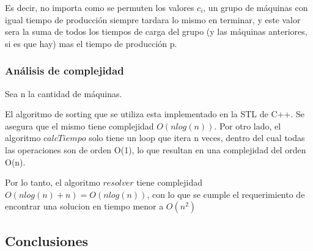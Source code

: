 Es decir, no importa como se permuten los valores $c_i$, un grupo de m\'aquinas con igual tiempo de producci\'on siempre tardara lo mismo en terminar, y este valor sera la suma de todos los tiempos de carga del grupo (y las m\'aquinas anteriores, si es que hay) mas el tiempo de producci\'on p.
 

\subsubsection{An\'alisis de complejidad}
 
 Sea n la cantidad de m\'aquinas.
 
 El algoritmo de sorting que se utiliza esta implementado en la STL de C++. Se asegura que el mismo tiene complejidad $O(n log(n))$.
 Por otro lado, el algoritmo $calcTiempo$ solo tiene un loop que itera n veces, dentro del cual todas las operaciones son de orden O(1), lo que resultan en una complejidad del orden O(n).
 
Por lo tanto, el algoritmo $resolver$ tiene complejidad $O(n log(n) + n) = O(n log(n))$, con lo que se cumple el requerimiento de encontrar una solucion en tiempo menor a $O(n^2)$

\subsection{Conclusiones}